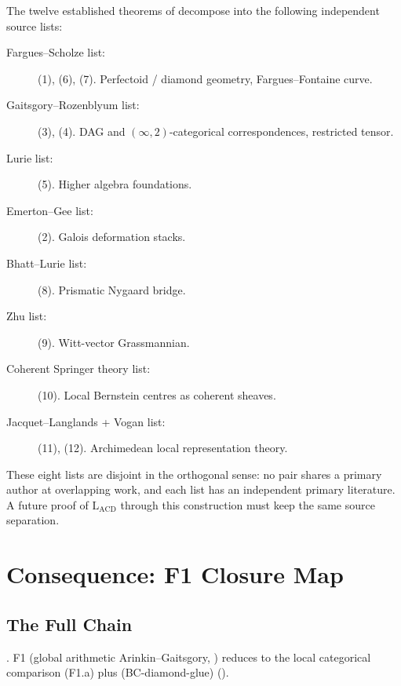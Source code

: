 \begin{remark}
\label{v4-arith:acd:rem:source-disjoint-decomposition}
The twelve established theorems of
 decompose into the
following independent source lists:
\begin{description}
\item[Fargues--Scholze list:] (1), (6), (7). Perfectoid / diamond
geometry, Fargues--Fontaine curve.
\item[Gaitsgory--Rozenblyum list:] (3), (4). DAG and
\((\infty,2)\)-categorical correspondences, restricted tensor.
\item[Lurie list:] (5). Higher algebra foundations.
\item[Emerton--Gee list:] (2). Galois deformation stacks.
\item[Bhatt--Lurie list:] (8). Prismatic Nygaard bridge.
\item[Zhu list:] (9). Witt-vector Grassmannian.
\item[Coherent Springer theory list:] (10). Local Bernstein
centres as coherent sheaves.
\item[Jacquet--Langlands + Vogan list:] (11), (12). Archimedean
local representation theory.
\end{description}
These eight lists are disjoint in the orthogonal sense: no pair shares
a primary author at overlapping work, and each list has an
independent primary literature. A future proof of
\(\mathrm{L}_{\mathrm{ACD}}\) through this construction must keep the same
source separation.
\end{remark}

\section{Consequence: F1 Closure Map}
\label{v4-arith:acd:F1-closure-map}

\subsection{The Full Chain}

\begin{theorem}
\label{v4-arith:acd:thm:F1-closure}
\ClaimStatusNeedsVerification. F1 (global arithmetic
Arinkin--Gaitsgory, ) reduces to
the local categorical comparison (F1.a) plus
(BC-diamond-glue) ().
\end{theorem}

